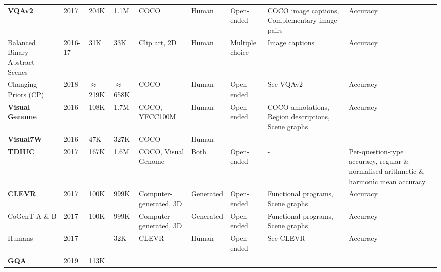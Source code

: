 \begin{center}
\begin{xltabular}{\textwidth}{LLLLLLLLL}
  \textbf{VQAv2} \cite{goyal2017making}
  & 2017
  & 204K  %
  & 1.1M  %
  & COCO
  & Human
  & Open-ended
  & COCO image captions, Complementary image pairs
  & Accuracy\footnotemark[\value{footnote}] \\
  Balanced Binary Abstract Scenes \cite{zhang2016yin}
  & 2016-17
  & 31K %
  & 33K %
  & Clip art, 2D
  & Human
  & Multiple choice
  & Image captions
  & Accuracy\footnotemark[\value{footnote}] \\
  Changing Priors (CP) \cite{agrawal2018dont}
  & 2018
  & {\color{red}\(\approx\)219K}  %
  & {\color{red}\(\approx\)658K}  %
  & COCO
  & Human
  & Open-ended
  & See VQAv2
  & Accuracy\footnotemark[\value{footnote}] \\
  \textbf{Visual Genome} \cite{krishna2017visual}
  & 2016
  & 108K  %
  & 1.7M  %
  & COCO, YFCC100M \cite{thomee2016yfcc100m}
  & Human
  & Open-ended
  & COCO annotations, Region descriptions, Scene graphs
  & Accuracy \\
  \textbf{Visual7W} \cite{zhu2016visual7w}
  & 2016
  & 47K %
  & 327K %
  & COCO
  & Human
  & -
  & - %
  & - \\
  \textbf{TDIUC} \cite{kafle2017analysis}
  & 2017
  & 167K %
  & 1.6M %
  & COCO, Visual Genome
  & Both
  & Open-ended
  & -
  & Per-question-type accuracy, regular \& normalised arithmetic \& harmonic mean accuracy\\
  \textbf{CLEVR} \cite{johnson2017clevr}
  & 2017
  & 100K  %
  & 999K  %
  & Computer-generated, 3D
  & Generated
  & Open-ended
  & Functional programs, Scene graphs
  & Accuracy \\
  CoGenT-A \& B
  & 2017
  & 100K
  & 999K
  & Computer-generated, 3D 
  & Generated
  & Open-ended
  & Functional programs, Scene graphs
  & Accuracy \\
  Humans
  & 2017
  & -
  & 32K  %
  & CLEVR
  & Human
  & Open-ended
  & See CLEVR
  & Accuracy \\
  \textbf{GQA} \cite{hudson2019gqa}
  & 2019
  & 113K  %

\end{xltabular}
\end{center}
